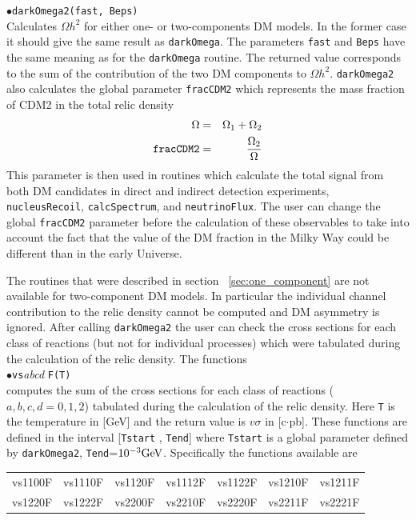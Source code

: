 \documentclass[12pt,a4paper]{article}
\begin{document}
$\bullet$\verb|darkOmega2(fast, Beps)|\\
Calculates $\Omega h^2$ for either  one- or  two-components DM models. In the former case it should give the same result as \verb|darkOmega|.
The parameters {\tt fast} and {\tt Beps} have the same meaning as for the {\tt darkOmega} routine.
The returned value corresponds to the sum of the contribution of the two  DM components to  $\Omega h^2$.  
 \verb|darkOmega2| also calculates the  global parameter {\tt fracCDM2} which represents the mass fraction of CDM2 
in the total relic density
\begin{eqnarray}
  \Omega &=& \Omega_1+\Omega_2\\
  \verb|fracCDM2|&=&\frac{\Omega_2}{\Omega}
\end{eqnarray}
This parameter is then used in routines which calculate the total signal from both  DM candidates in direct and indirect detection experiments,
 \verb|nucleusRecoil|, \verb|calcSpectrum|,  and \verb|neutrinoFlux|.  The user can change the global {\tt  fracCDM2} parameter before the calculation of these observables
to take into account the fact that the value of the DM fraction in the Milky Way could be different than   in the early Universe.

The routines that were described in section ~\ref{sec:one_component} are not available for two-component DM models. In particular the individual channel contribution to the relic density cannot be computed and DM asymmetry is ignored. 
 After calling  {\tt  darkOmega2}  the user can check the  cross sections  
for each class of reactions (but not for individual processes) which were tabulated during the calculation of the relic density. 
The functions\\
$\bullet$\verb|vs|{\it abcd} \verb|F(T)|\\
computes the sum of  the cross sections  
for each class of reactions ($a,b,c,d=0,1,2$) tabulated during the calculation of the relic density. 
Here  \verb|T| is the temperature in [GeV] and the 
return value is $v\sigma$ in [c$\cdot$pb].  These functions are defined in the interval [{\tt Tstart} , {\tt Tend}] where
{\tt Tstart} is a global parameter defined by \verb|darkOmega2|, {\tt Tend}=$10^{-3}{\rm GeV}$. Specifically the functions available are

\begin{center}
\begin{tabular}{ l l l l l l l }
vs1100F & vs1110F & vs1120F&vs1112F&vs1122F&vs1210F&vs1211F\\
vs1220F&vs1222F&vs2200F&vs2210F&vs2220F&vs2211F& vs2221F
\end{tabular}
\end{center} 
\end{document}
